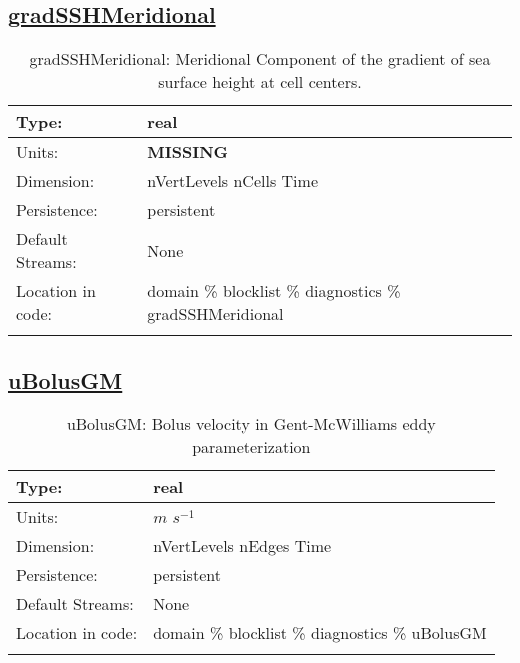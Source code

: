 \subsection[gradSSHMeridional]{\hyperref[sec:var_tab_diagnostics]{gradSSHMeridional}}
\label{subsec:var_sec_diagnostics_gradSSHMeridional}
\begin{center}
\begin{longtable}{| p{2.0in} | p{4.0in} |}
        \hline 
        Type: & real \\
        \hline 
        Units: & {\bf \color{red} MISSING} \\
        \hline 
        Dimension: & nVertLevels nCells Time \\
        \hline 
        Persistence: & persistent \\
        \hline 
		 Default Streams: & None \\
        \hline 
		 Location in code: & domain \% blocklist \% diagnostics \% gradSSHMeridional \\
		 \hline 
    \caption{gradSSHMeridional: Meridional Component of the gradient of sea surface height at cell centers.}
\end{longtable}
\end{center}
\subsection[uBolusGM]{\hyperref[sec:var_tab_diagnostics]{uBolusGM}}
\label{subsec:var_sec_diagnostics_uBolusGM}
\begin{center}
\begin{longtable}{| p{2.0in} | p{4.0in} |}
        \hline 
        Type: & real \\
        \hline 
        Units: & $m$ $s^{-1}$ \\
        \hline 
        Dimension: & nVertLevels nEdges Time \\
        \hline 
        Persistence: & persistent \\
        \hline 
		 Default Streams: & None \\
        \hline 
		 Location in code: & domain \% blocklist \% diagnostics \% uBolusGM \\
		 \hline 
    \caption{uBolusGM: Bolus velocity in Gent-McWilliams eddy parameterization}
\end{longtable}
\end{center}
